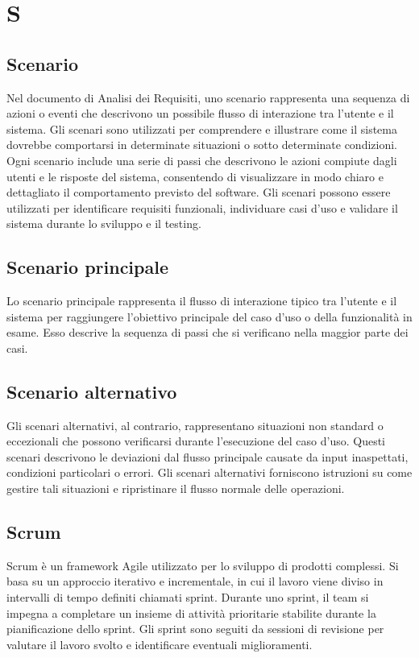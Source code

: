 \section{S} 
\subsection{Scenario} 
Nel documento di Analisi dei Requisiti, uno scenario rappresenta una sequenza di azioni o eventi che descrivono un possibile flusso di interazione tra l'utente e il sistema. Gli scenari sono utilizzati per comprendere e illustrare come il sistema dovrebbe comportarsi in determinate situazioni o sotto determinate condizioni. Ogni scenario include una serie di passi che descrivono le azioni compiute dagli utenti e le risposte del sistema, consentendo di visualizzare in modo chiaro e dettagliato il comportamento previsto del software. Gli scenari possono essere utilizzati per identificare requisiti funzionali, individuare casi d'uso e validare il sistema durante lo sviluppo e il testing. 
\subsection{Scenario principale} 
Lo scenario principale rappresenta il flusso di interazione tipico tra l'utente e il sistema per raggiungere l'obiettivo principale del caso d'uso o della funzionalità in esame. Esso descrive la sequenza di passi che si verificano nella maggior parte dei casi.
\subsection{Scenario alternativo} 
Gli scenari alternativi, al contrario, rappresentano situazioni non standard o eccezionali che possono verificarsi durante l'esecuzione del caso d'uso. Questi scenari descrivono le deviazioni dal flusso principale causate da input inaspettati, condizioni particolari o errori. Gli scenari alternativi forniscono istruzioni su come gestire tali situazioni e ripristinare il flusso normale delle operazioni.
\subsection{Scrum} 
Scrum è un framework Agile utilizzato per lo sviluppo di prodotti complessi. Si basa su un approccio iterativo e incrementale, in cui il lavoro viene diviso in intervalli di tempo definiti chiamati sprint. Durante uno sprint, il team si impegna a completare un insieme di attività prioritarie stabilite durante la pianificazione dello sprint. Gli sprint sono seguiti da sessioni di revisione per valutare il lavoro svolto e identificare eventuali miglioramenti. 
